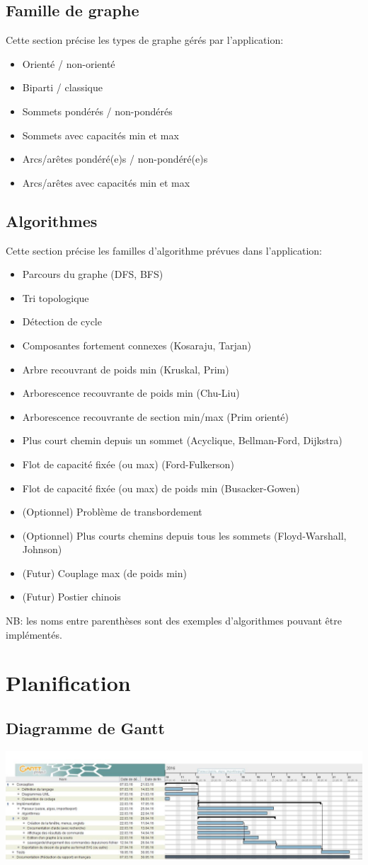 \documentclass[french]{article}
\begin{document}
		\subsection{Famille de graphe}
			Cette section précise les types de graphe gérés par l'application:
			\begin{itemize}
				\item Orienté / non-orienté
				\item Biparti / classique
				\item Sommets pondérés / non-pondérés
				\item Sommets avec capacités min et max
				\item Arcs/arêtes pondéré(e)s / non-pondéré(e)s
				\item Arcs/arêtes avec capacités min et max
			\end{itemize}
			
		\subsection{Algorithmes}
			Cette section précise les familles d'algorithme prévues dans l'application:
			\begin{itemize}
				\item Parcours du graphe (DFS, BFS)
				\item Tri topologique
				\item Détection de cycle
				\item Composantes fortement connexes (Kosaraju, Tarjan) 
				\item Arbre recouvrant de poids min (Kruskal, Prim)
				\item Arborescence recouvrante de poids min (Chu-Liu)
				\item Arborescence recouvrante de section min/max (Prim orienté)
				\item Plus court chemin depuis un sommet (Acyclique, Bellman-Ford, Dijkstra)
				\item Flot de capacité fixée (ou max) (Ford-Fulkerson)
				\item Flot de capacité fixée (ou max) de poids min (Busacker-Gowen)
				\item (Optionnel) Problème de transbordement
				\item (Optionnel) Plus courts chemins depuis tous les sommets (Floyd-Warshall, Johnson)
				\item (Futur) Couplage max (de poids min)
				\item (Futur) Postier chinois
			\end{itemize}
			NB: les noms entre parenthèses sont des exemples d'algorithmes pouvant être implémentés.
		
	\section{Planification}
		\subsection{Diagramme de Gantt}
			\includegraphics[width=\textwidth]{diagram_gantt}
			
\end{document}
